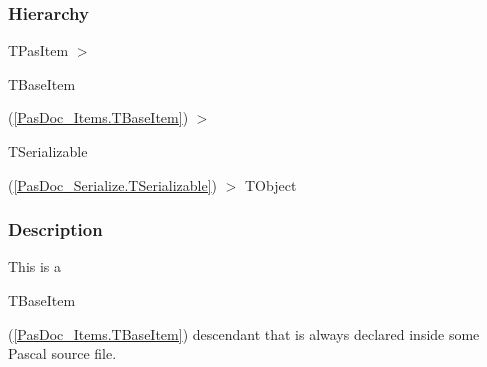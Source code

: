 \documentclass{report}
\begin{document}
\subsubsection*{\large{\textbf{Hierarchy}}\normalsize\hspace{1ex}\hfill}
TPasItem {$>$} \begin{ttfamily}TBaseItem\end{ttfamily}(\ref{PasDoc_Items.TBaseItem}) {$>$} \begin{ttfamily}TSerializable\end{ttfamily}(\ref{PasDoc_Serialize.TSerializable}) {$>$} 
TObject
\subsubsection*{\large{\textbf{Description}}\normalsize\hspace{1ex}\hfill}
This is a \begin{ttfamily}TBaseItem\end{ttfamily}(\ref{PasDoc_Items.TBaseItem}) descendant that is always declared inside some Pascal source file.
\end{document}
